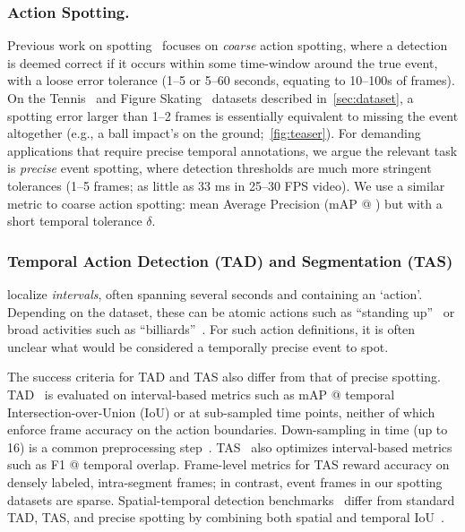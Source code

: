 \documentclass[runningheads]{llncs}
\newcommand{\notation}[1]{\ensuremath{#1}\xspace}
\newcommand{\Tolerance}{\notation{\delta}}
\begin{document}
\subsubsection*{Action Spotting.}
Previous work on spotting~\cite{soccernetv2} focuses
on \emph{coarse} action spotting, where a detection is deemed correct if it
occurs within some time-window around the true event, with a loose error
tolerance (1--5 or 5--60 seconds, equating to 10--100s of frames).
On the Tennis~\cite{vid2player} and Figure Skating~\cite{vpd} datasets described in~\autoref{sec:dataset}, a spotting
error larger than 1--2 frames is essentially equivalent to missing the event
altogether (e.g., a ball impact's on the ground;~\autoref{fig:teaser}).
For demanding applications that require precise temporal annotations,
we argue the relevant task is \emph{precise} event spotting, where
detection thresholds are much more stringent tolerances (1--5 frames; as little as 33 ms in 25--30 FPS video).
We use a similar metric to coarse action spotting: mean Average Precision (mAP @ ) but with a short temporal tolerance \Tolerance.

\subsubsection*{Temporal Action Detection (TAD) and Segmentation (TAS)} localize \emph{intervals}, often spanning several seconds and containing an `action'. Depending on the dataset, these can be atomic actions such as ``standing up''~\cite{charades} or broad activities such as ``billiards''~\cite{thumos14}.
For such action definitions, it is often unclear what would be considered a temporally precise event to spot.

The success criteria for TAD and TAS also differ from that of precise spotting.
TAD~\cite{activitynet,toyotasmarthome,thumos14,charades,multithumos} is evaluated on interval-based metrics such as mAP @ temporal Intersection-over-Union (IoU) or at sub-sampled time points, neither of which enforce frame accuracy on the action boundaries.
Down-sampling in time (up to 16) is a common preprocessing step~\cite{sstad,bmn,bsn,charadeschallenge,gtad,actionformer}.
TAS~\cite{gtea,breakfast,50salads} also optimizes interval-based metrics such as F1 @ temporal overlap.
Frame-level metrics for TAS reward accuracy on densely labeled, intra-segment frames; in contrast, event frames in our spotting datasets are sparse.
Spatial-temporal detection benchmarks~\cite{avakinetics,multisports} differ from standard TAD, TAS, and precise spotting by combining both spatial and temporal IoU~\cite{multisports}.
\end{document}
